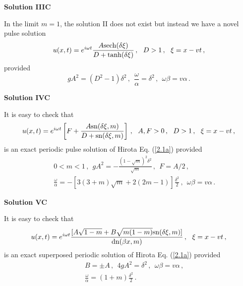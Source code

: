 \documentclass[11pt]{article}
\newcommand{\be}{\begin{equation}}
\newcommand{\ee}{\end{equation}}
\newcommand{\bea}{\begin{eqnarray}}
\newcommand{\eea}{\end{eqnarray}}
\newcommand{\sn}{{\rm sn}}
\newcommand{\dn}{{\rm dn}}
\newcommand{\sech}{{\rm sech}}
\begin{document}
{\bf Solution IIIC}

In the limit $m = 1$, the solution II does not exist but instead we have a 
novel pulse solution
\be\label{C5}
u(x,t) = e^{i\omega t} \frac{A\sech(\delta \xi)}{D+\tanh(\delta \xi)}\,,
~~D > 1\,,~~\xi = x -vt\,,
\ee
provided
\be\label{C6}
g A^2 = (D^2-1) \delta^2\,,~~\frac{\omega}{\alpha} = \delta^2\,, 
~~\omega \beta = v \alpha\,.
\ee

{\bf Solution IVC}

It is easy to check that 
\be\label{C7}
u(x,t) = e^{i\omega t} \left[F+\frac{A\sn(\delta \xi,m)}{D+\sn(\delta \xi,m)}\right]\,,
~~A,F> 0\,,~~ D > 1\,,~~\xi = x-vt\,,
\ee
is an exact periodic pulse solution of Hirota Eq. (\ref{2.1a}) provided 
\bea\label{C8}
&&0 < m < 1\,,~~ g A^2 = -\frac{(1-\sqrt{m})^2 \delta^2}{\sqrt{m}}\,,
~~F = A/2\,, \nonumber \\
&&\frac{\omega}{\alpha} = -[3(3+m)\sqrt{m}+2(2m-1)]\frac{\delta^2}{2}\,, 
~~\omega \beta = v \alpha\,.
\eea

{\bf Solution VC}

It is easy to check that 
\be\label{C9}
u(x,t) = e^{i\omega t} \frac{[A\sqrt{1-m}+B\sqrt{m(1-m)}\sn(\delta \xi,m)]}
{\dn(\beta x,m)}\,,~~\xi = x-vt\,,
\ee
is an exact superposed periodic solution of Hirota Eq. (\ref{2.1a}) provided
\bea\label{C10}
&&B = \pm A\,,~~4g A^2 = \delta^2\,,~~\omega \beta = v \alpha\,,
\nonumber \\
&&\frac{\omega}{\alpha} = (1+m)\frac{\delta^2}{2}\,.
\eea

\end{document}

